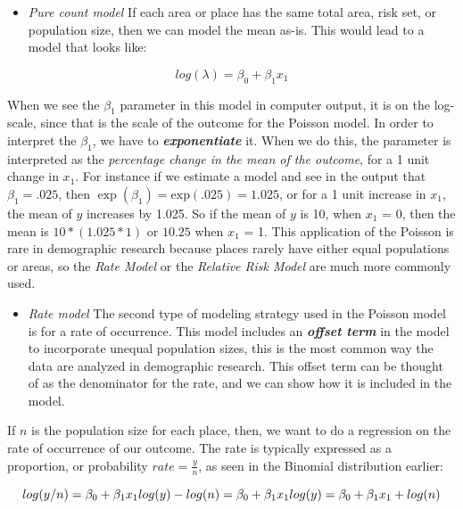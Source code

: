 \documentclass[
  letterpaper,
  DIV=11,
  numbers=noendperiod]{scrreprt}
\providecommand{\tightlist}{%
  \setlength{\itemsep}{0pt}\setlength{\parskip}{0pt}}\usepackage{longtable,booktabs,array}
\begin{document}
\begin{itemize}
\tightlist
\item
  \emph{Pure count model} If each area or place has the same total area,
  risk set, or population size, then we can model the mean as-is. This
  would lead to a model that looks like:
\end{itemize}

\[log(\lambda)= \beta_0 + \beta_1 x_1\]

When we see the \(\beta_1\) parameter in this model in computer output,
it is on the log-scale, since that is the scale of the outcome for the
Poisson model. In order to interpret the \(\beta_1\), we have to
\textbf{\emph{exponentiate}} it. When we do this, the parameter is
interpreted as the \emph{percentage change in the mean of the outcome},
for a 1 unit change in \(x_1\). For instance if we estimate a model and
see in the output that \(\beta_1 = \text{.025}\), then
\(\exp(\beta_1) = \text{exp}(\text{.025}) = \text{1.025}\), or for a 1
unit increase in \(x_1\), the mean of \(y\) increases by 1.025. So if
the mean of \(y\) is 10, when \(x_1\) = 0, then the mean is
\(10*(1.025*1)\) or \(10.25\) when \(x_1\) = 1. This application of the
Poisson is rare in demographic research because places rarely have
either equal populations or areas, so the \emph{Rate Model} or the
\emph{Relative Risk Model} are much more commonly used.

\begin{itemize}
\tightlist
\item
  \emph{Rate model} The second type of modeling strategy used in the
  Poisson model is for a rate of occurrence. This model includes an
  \textbf{\emph{offset term}} in the model to incorporate unequal
  population sizes, this is the most common way the data are analyzed in
  demographic research. This offset term can be thought of as the
  denominator for the rate, and we can show how it is included in the
  model.
\end{itemize}

If \(n\) is the population size for each place, then, we want to do a
regression on the rate of occurrence of our outcome. The rate is
typically expressed as a proportion, or probability
\(rate = \frac{y}{n}\), as seen in the Binomial distribution earlier:

\[
log(y/n)= \beta_0 + \beta_1 x_1 \\
log(y) - log(n)= \beta_0 + \beta_1 x_1\\
log(y)= \beta_0 + \beta_1 x_1 + log(n)
\]
\end{document}
